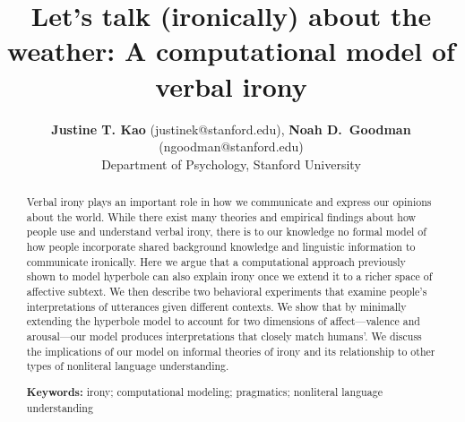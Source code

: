 \documentclass[10pt,letterpaper]{article}
\title{Let's talk (ironically) about the weather: A computational model of verbal irony}
\author{{\large {\bf Justine T. Kao} (justinek@stanford.edu)}, {\large {\bf Noah D.~Goodman} (ngoodman@stanford.edu)}\\
  Department of Psychology, Stanford University}
\begin{document}
\maketitle


\begin{abstract}
Verbal irony plays an important role in how we communicate and express our opinions about the world. While there exist many theories and empirical findings about how people use and understand verbal irony, there is to our knowledge no formal model of how people incorporate shared background knowledge and linguistic information to communicate ironically. Here we argue that a computational approach previously shown to model hyperbole \cite{kao2014nonliteral} can also explain irony once we extend it to a richer space of affective subtext. We then describe two behavioral experiments that examine people's interpretations of utterances given different contexts. We show that by minimally extending the hyperbole model to account for two dimensions of affect---valence and arousal---our model produces interpretations that closely match humans'. We discuss the implications of our model on informal theories of irony and its relationship to other types of nonliteral language understanding.


\textbf{Keywords:} 
irony; computational modeling; pragmatics; nonliteral language understanding
\end{abstract}
\end{document}
